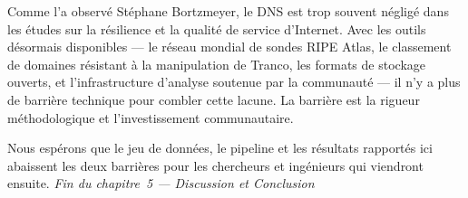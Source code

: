 Comme l'a observé Stéphane Bortzmeyer, le DNS est trop souvent négligé dans les études sur la résilience et la qualité de service d'Internet. Avec les outils désormais disponibles --- le réseau mondial de sondes RIPE Atlas, le classement de domaines résistant à la manipulation de Tranco, les formats de stockage ouverts, et l'infrastructure d'analyse soutenue par la communauté --- il n'y a plus de barrière technique pour combler cette lacune. La barrière est la rigueur méthodologique et l'investissement communautaire.

Nous espérons que le jeu de données, le pipeline et les résultats rapportés ici abaissent les deux barrières pour les chercheurs et ingénieurs qui viendront ensuite.
\bigskip
\textit{Fin du chapitre~5 --- Discussion et Conclusion}
